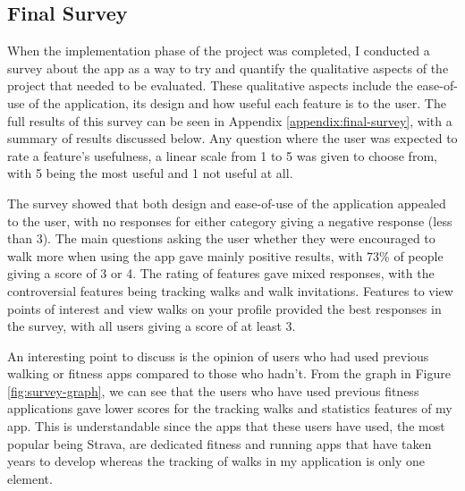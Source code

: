 \subsection{Final Survey}


When the implementation phase of the project was completed, I conducted a survey about the app as a way to try and quantify the qualitative aspects of the project that needed to be evaluated. These qualitative aspects include the ease-of-use of the application, its design and how useful each feature is to the user. The full results of this survey can be seen in Appendix \ref{appendix:final-survey}, with a summary of results discussed below. Any question where the user was expected to rate a feature's usefulness, a linear scale from 1 to 5 was given to choose from, with 5 being the most useful and 1 not useful at all. 

The survey showed that both design and ease-of-use of the application appealed to the user, with no responses for either category giving a negative response (less than 3). The main questions asking the user whether they were encouraged to walk more when using the app gave mainly positive results, with 73\% of people giving a score of 3 or 4. The rating of features gave mixed responses, with the controversial features being tracking walks and walk invitations. Features to view points of interest and view walks on your profile provided the best responses in the survey, with all users giving a score of at least 3.

An interesting point to discuss is the opinion of users who had used previous walking or fitness apps compared to those who hadn't. From the graph in Figure \ref{fig:survey-graph}, we can see that the users who have used previous fitness applications gave lower scores for the tracking walks and statistics features of my app. This is understandable since the apps that these users have used, the most popular being Strava, are dedicated fitness and running apps that have taken years to develop whereas the tracking of walks in my application is only one element.

